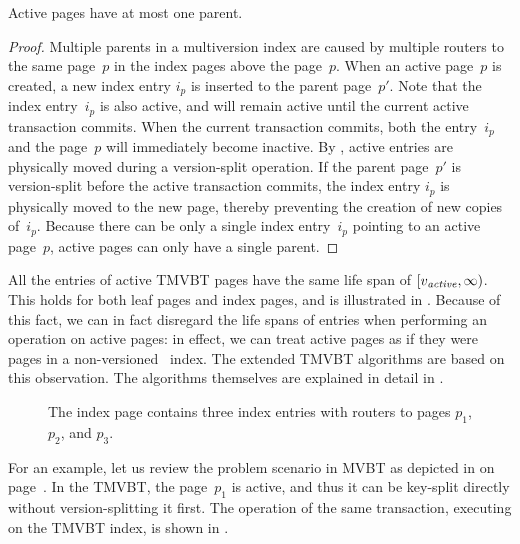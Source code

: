 \thmskip
\begin{lemma}
\label{lemma:active-pages-single-parent}
Active pages have at most one parent.
\end{lemma}
\begin{proof}
Multiple parents in a multiversion index are caused by multiple routers to
the same page~$p$ in the index pages above the page~$p$.
When an active page~$p$ is created, a new index entry $i_p$ is inserted to the
parent page~$p'$. 
Note that the index entry~$i_p$ is also active, and will remain active until
the current active transaction commits.
When the current transaction commits, both the entry~$i_p$ and the page~$p$
will immediately become inactive.
By , active entries are physically moved
during a version-split operation.
If the parent page~$p'$ is version-split before the active transaction
commits, the index entry $i_p$ is physically moved to the new page,
thereby preventing the creation of new copies of~$i_p$.
Because there can be only a single index entry~$i_p$ pointing to an
active page~$p$, active pages can only have a single parent.
\end{proof}
\thmskip

All the entries of active TMVBT pages have the same life span of $[\smash{v_{\text{\textit{active}}}},
\infty)$. 
This holds for both leaf pages and index pages, and is illustrated in
.
Because of this fact, we can in fact disregard the life spans of entries when
performing an operation on active pages: in effect, we can treat active pages
as if they were pages in a non-versioned \Btree\ index.
The extended TMVBT algorithms are based on this observation.
The algorithms themselves are explained in detail in .

\begin{figure}[!htb]
\begin{center}
%
{The index page contains three index entries with routers to pages $p_1$,
$p_2$, and $p_3$.}
\label{fig:tmvbt-active-entries}
\end{center}
\end{figure}

For an example, let us review the problem scenario in MVBT as depicted in
 on page~\pageref{fig:mvbt-invalid-split}.
In the TMVBT, the page~$p_1$ is active, and thus it can be key-split directly
without version-splitting it first.
The operation of the same transaction, executing on the TMVBT index, is shown
in .

